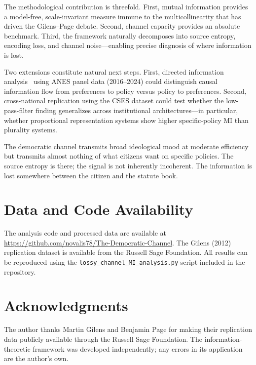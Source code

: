\documentclass[twocolumn,10pt]{article}
\begin{document}
The methodological contribution is threefold.  First, mutual information provides a model-free, scale-invariant measure immune to the multicollinearity that has driven the Gilens--Page debate.  Second, channel capacity provides an absolute benchmark.  Third, the framework naturally decomposes into source entropy, encoding loss, and channel noise---enabling precise diagnosis of where information is lost.

Two extensions constitute natural next steps.  First, directed information analysis~\citep{massey1990} using ANES panel data (2016--2024) could distinguish causal information flow from preferences to policy versus policy to preferences.  Second, cross-national replication using the CSES dataset could test whether the low-pass-filter finding generalizes across institutional architectures---in particular, whether proportional representation systems show higher specific-policy MI than plurality systems.

The democratic channel transmits broad ideological mood at moderate efficiency but transmits almost nothing of what citizens want on specific policies.  The source entropy is there; the signal is not inherently incoherent.  The information is lost somewhere between the citizen and the statute book.

\section*{Data and Code Availability}

The analysis code and processed data are available at \url{https://github.com/novalis78/The-Democratic-Channel}.  The Gilens (2012) replication dataset is available from the Russell Sage Foundation.  All results can be reproduced using the \texttt{lossy\_channel\_MI\_analysis.py} script included in the repository.

\section*{Acknowledgments}

The author thanks Martin Gilens and Benjamin Page for making their replication data publicly available through the Russell Sage Foundation.  The information-theoretic framework was developed independently; any errors in its application are the author's own.
\end{document}
